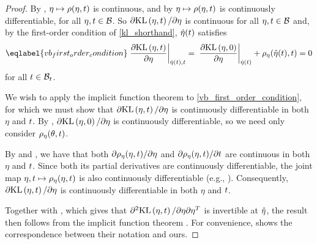 \begin{thm}
\begin{proof}
%
By , $\eta \mapsto \rho(\eta, t)$ is continuous, and
by  $\eta \mapsto \rho(\eta, t)$ is continuously
differentiable, for all $\eta, t \in \mathcal{B}$.  So $\partial \mathrm{KL}\left(\eta, t\right)  /
\partial \eta$ is continuous for all $\eta, t \in \mathcal{B}$ and, by the
first-order condition of \eqref{kl_shorthand}, $\hat\eta(t)$ satisfies
%
\begin{align}\eqlabel{vb_first_order_condition}
%
\fracat{\partial \KL{\eta, \t}}{ \partial \eta}{\etaopt(\t), \t} ={}
\fracat{\partial \KL{\eta, 0}}{ \partial \eta}{\etaopt(\t)}
+  \rho_\eta(\etaopt(\t), \t) ={} 0
%
\end{align}
%
for all $t \in \mathcal{B}_t$.

We wish to apply the implicit function theorem to
\eqref{vb_first_order_condition}, for which we must show that $\partial
\mathrm{KL}\left(\eta, t\right) / \partial \eta$ is continuously differentiable in both $\eta$ and
$t$.  By , $\partial \mathrm{KL}\left(\eta, 0\right) /
\partial \eta$ is continuously differentiable, so we need only consider
$\rho_\eta(\theta, t)$.

By  and , we
have that both $\partial \rho_\eta(\eta, t) / \partial \eta$ and $\partial
\rho_\eta(\eta, t) / \partial t$ are continuous in both $\eta$ and $t$.
Since both its partial derivatives are continuously differentiable, the joint
map $\eta, t \mapsto \rho_\eta(\eta, t)$ is also continuously differentiable
(e.g., \citet[Theorem 3.2]{fleming:2012:functions}).  Consequently, $\partial
\mathrm{KL}\left(\eta, t\right) / \partial \eta$ is continuously differentiable in both $\eta$ and
$t$.


Together with , which gives that $\partial^2
\mathrm{KL}\left(\eta, t\right) / \partial \eta \partial\eta^T$ is invertible at $\hat\eta$, the
result then follows from the implicit function theorem \citet[Theorem
3.3.1]{krantz:2012:implicit}. For convenience,  shows the
correspondence between their notation and ours.


\end{proof}
\end{thm}

